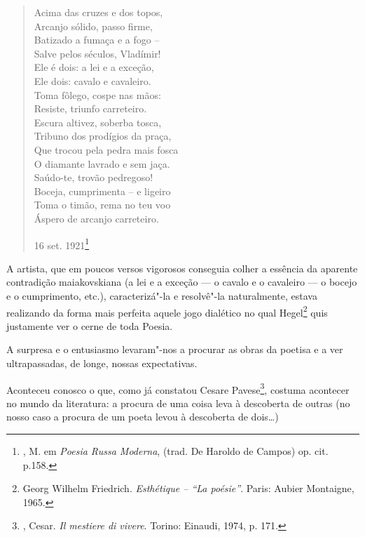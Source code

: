 \begin{verse}
Acima das cruzes e dos topos, \\
Arcanjo sólido, passo firme, \\
Batizado a fumaça e a fogo -- \\
Salve pelos séculos, Vladímir! \\[8pt]
Ele é dois: a lei e a exceção, \\
Ele dois: cavalo e cavaleiro. \\
Toma fôlego, cospe nas mãos: \\
Resiste, triunfo carreteiro. \\[8pt]
Escura altivez, soberba tosca, \\
Tribuno dos prodígios da praça, \\
Que trocou pela pedra mais fosca \\
O diamante lavrado e sem jaça. \\[8pt]
Saúdo-te, trovão pedregoso! \\
Boceja, cumprimenta -- e ligeiro \\
Toma o timão, rema no teu voo \\
Áspero de arcanjo carreteiro. 
\begin{flushright}
16 set. 1921\footnote{, M. em \emph{Poesia Russa Moderna}, (trad. De Haroldo de Campos) op. cit. p.158.}
\end{flushright}
\end{verse}

A artista, que em poucos versos vigorosos conseguia colher a essência da
aparente contradição maiakovskiana (a lei e a exceção --- o cavalo e o
cavaleiro --- o bocejo e o cumprimento, etc.), caracterizá"-la e
resolvê"-la naturalmente, estava realizando da forma mais perfeita aquele
jogo dialético no qual Hegel\footnote{ Georg Wilhelm
  Friedrich. \emph{Esthétique -- ``La poésie''}. Paris: Aubier
  Montaigne, 1965.} quis justamente ver o cerne de toda Poesia.

A surpresa e o entusiasmo levaram"-nos a procurar as obras da poetisa e a
ver ultrapassadas, de longe, nossas expectativas.

Aconteceu conosco o que, como já constatou Cesare Pavese\footnote{,
  Cesar. \emph{Il mestiere di vivere}. Torino: Einaudi, 1974, p. 171.},
costuma acontecer no mundo da literatura: a procura de uma coisa leva à
descoberta de outras (no nosso caso a procura de um poeta levou à
descoberta de dois\ldots{})

